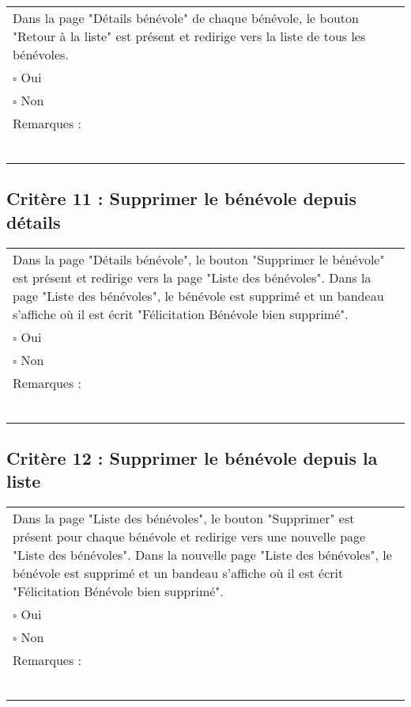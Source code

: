 	\begin{center}
    	 		\begin{tabular}[h]{|p{}|}
			\hline
				Dans la page "Détails bénévole" de chaque bénévole, le bouton "Retour à la liste" est présent et redirige vers la liste de tous les bénévoles.\\
				$\square$ Oui  \\ $\square$ Non \\\hline Remarques : \\ ~\\
			 \\\hline
     		\end{tabular}
  		\end{center}	
  		
  		
  		\subsection*{Critère 11 : Supprimer le bénévole depuis détails}
	
	\begin{center}
    	 		\begin{tabular}[h]{|p{}|}
			\hline
				Dans la page "Détails bénévole", le bouton "Supprimer le bénévole" est présent et redirige vers la page "Liste des bénévoles". Dans la page "Liste des bénévoles", le bénévole est supprimé et un bandeau s'affiche où il est écrit "Félicitation Bénévole bien supprimé".\\
				$\square$ Oui  \\ $\square$ Non \\\hline Remarques : \\ ~\\
			 \\\hline
     		\end{tabular}
  		\end{center}
  		
  		
  		
  			\subsection*{Critère 12 : Supprimer le bénévole depuis la liste}
	
	\begin{center}
    	 		\begin{tabular}[h]{|p{}|}
			\hline
				Dans la page "Liste des bénévoles", le bouton "Supprimer" est présent pour chaque bénévole et redirige vers une nouvelle page "Liste des bénévoles". Dans la nouvelle page "Liste des bénévoles", le bénévole est supprimé et un bandeau s'affiche où il est écrit "Félicitation Bénévole bien supprimé".\\
				$\square$ Oui  \\ $\square$ Non \\\hline Remarques : \\ ~\\
			 \\\hline
     		\end{tabular}
  		\end{center}

